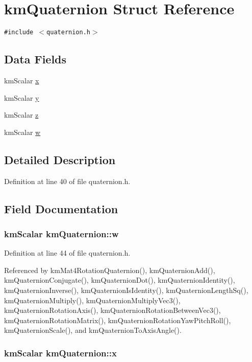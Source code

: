 \hypertarget{structkm_quaternion}{
\section{kmQuaternion Struct Reference}
\label{structkm_quaternion}
}
{\tt \#include $<$quaternion.h$>$}

\subsection*{Data Fields}
\begin{CompactItemize}
\item 
kmScalar \hyperlink{structkm_quaternion_e9cf860e36fa206f8c122f084ab7042d}{x}
\item 
kmScalar \hyperlink{structkm_quaternion_6cb097db1a5e24c5e6d7a673dd9b5c68}{y}
\item 
kmScalar \hyperlink{structkm_quaternion_63b2d2685be9e41190fdf45bf21e6690}{z}
\item 
kmScalar \hyperlink{structkm_quaternion_3278d1a1de6f6d29ca9fa08bde51e726}{w}
\end{CompactItemize}


\subsection{Detailed Description}


Definition at line 40 of file quaternion.h.

\subsection{Field Documentation}
\hypertarget{structkm_quaternion_3278d1a1de6f6d29ca9fa08bde51e726}{
\subsubsection[{w}]{\setlength{\rightskip}{0pt plus 5cm}kmScalar {\bf kmQuaternion::w}}}
\label{structkm_quaternion_3278d1a1de6f6d29ca9fa08bde51e726}




Definition at line 44 of file quaternion.h.

Referenced by kmMat4RotationQuaternion(), kmQuaternionAdd(), kmQuaternionConjugate(), kmQuaternionDot(), kmQuaternionIdentity(), kmQuaternionInverse(), kmQuaternionIsIdentity(), kmQuaternionLengthSq(), kmQuaternionMultiply(), kmQuaternionMultiplyVec3(), kmQuaternionRotationAxis(), kmQuaternionRotationBetweenVec3(), kmQuaternionRotationMatrix(), kmQuaternionRotationYawPitchRoll(), kmQuaternionScale(), and kmQuaternionToAxisAngle().\hypertarget{structkm_quaternion_e9cf860e36fa206f8c122f084ab7042d}{
\subsubsection[{x}]{\setlength{\rightskip}{0pt plus 5cm}kmScalar {\bf kmQuaternion::x}}}
\label{structkm_quaternion_e9cf860e36fa206f8c122f084ab7042d}




